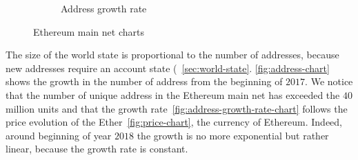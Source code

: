 \begin{figure}
\begin{subfigure}[b]{0.5\textwidth}
        \caption{Address growth rate}
        \label{fig:address-growth-rate-chart}
    \end{subfigure}
    \caption{Ethereum main net charts}
\end{figure}
The size of the world state is proportional to the number of addresses, because
new addresses require an account state (~\autoref{sec:world-state}. 
\autoref{fig:address-chart} shows the growth in the number of address from the 
beginning of $2017$. We notice that the number of unique address in the 
Ethereum main net has exceeded the $40$ million units and that the growth 
rate~\autoref{fig:address-growth-rate-chart} follows the price evolution of the 
Ether~\autoref{fig:price-chart}, the currency of Ethereum. Indeed, around 
beginning of year $2018$ the growth is no more exponential but rather linear,
because the growth rate is constant.